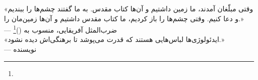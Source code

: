 \begin{tcolorbox}[quotebox, title={سخن پایانی فصل}]
«وقتی مبلّغان آمدند، ما زمین داشتیم و آن‌ها کتاب مقدس. به ما گفتند چشم‌ها را ببندیم و دعا کنیم. وقتی چشم‌ها را باز کردیم، ما کتاب مقدس داشتیم و آن‌ها زمین‌مان را.»\\
— ضرب‌المثل آفریقایی، منسوب به  ()\footnote{}\\[6pt]
«ایدئولوژی‌ها لباس‌هایی هستند که قدرت می‌پوشد تا برهنگی‌اش دیده نشود.»\\
— نویسنده
\end{tcolorbox}

\cleardoublepage